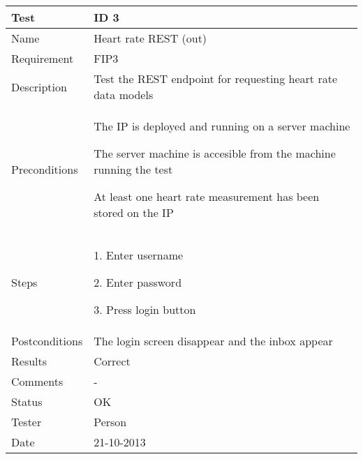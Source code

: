 \begin{table}
\begin{center}
\begin{tabular}{ | l | p{10cm} | }
	\hline
	\textbf{Test}	&	\textbf{ID 3} \\
	\hline\noalign{\smallskip}\noalign{\smallskip}\hline
	Name				& Heart rate REST (out) \\
	Requirement			& FIP3 \\
	Description			& Test the REST endpoint for requesting heart rate data models \\
	Preconditions		&	\par The IP is deployed and running on a server machine
							\par The server machine is accesible from the machine running the test
							\par At least one heart rate measurement has been stored on the IP \\
	Steps 				&	\par 1. Enter username
							\par 2. Enter password
							\par 3. Press login button \\
	Postconditions		& The login screen disappear and the inbox appear \\
	Results				& Correct \\
	Comments			& - \\
	Status				& OK \\
	Tester				& Person \\
	Date				& 21-10-2013 \\
	\hline
\end{tabular}
\end{center}
\end{table}


